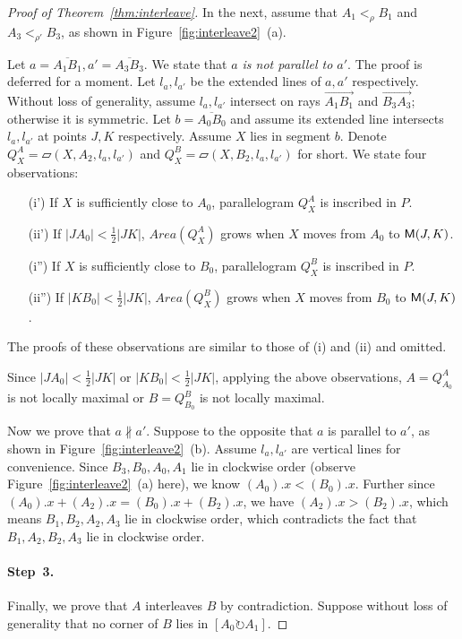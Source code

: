 \documentclass{ws-ijcga}
\begin{document}
\begin{proof}[Proof of Theorem~\ref{thm:interleave}]
In the next, assume that $A_1<_\rho B_1$ and $A_3<_{\rho'} B_3$, as shown in Figure~\ref{fig:interleave2}~(a).

\smallskip Let $a=\overline{A_1B_1},a'=\overline{A_3B_3}$.
We state that \emph{$a$ is not parallel to $a'$}. The proof is deferred for a moment.
Let $l_a,l_{a'}$ be the extended lines of $a,a'$ respectively.
Without loss of generality, assume $l_a,l_{a'}$ intersect on rays $\overrightarrow{A_1B_1}$ and $\overrightarrow{B_3A_3}$; otherwise it is symmetric.
Let $b=\overline{A_0B_0}$ and assume its extended line intersects $l_{a},l_{a'}$ at points $J,K$ respectively.
Assume $X$ lies in segment $b$. Denote $Q^A_X=\parallelogram(X,A_2,l_a,l_{a'})$ and $Q^B_X=\parallelogram(X,B_2,l_a,l_{a'})$ for short.
We state four observations:
\begin{enumerate}
\item[(i')] If $X$ is sufficiently close to $A_0$, parallelogram $Q^A_X$ is inscribed in $P$.
\item[(ii')] If $|JA_0|<\frac{1}{2}|JK|$, $Area(Q^A_X)$ grows when $X$ moves from $A_0$ to $\mathsf{M}(J,K)$.
\item[(i'')] If $X$ is sufficiently close to $B_0$, parallelogram $Q^B_X$ is inscribed in $P$.
\item[(ii'')] If $|KB_0|<\frac{1}{2}|JK|$, $Area(Q^B_X)$ grows when $X$ moves from $B_0$ to $\mathsf{M}(J,K)$.
\end{enumerate}
The proofs of these observations are similar to those of (i) and (ii) and omitted.

\smallskip Since $|JA_0|<\frac{1}{2}|JK|$ or $|KB_0|<\frac{1}{2}|JK|$,
applying the above observations, $A=Q^A_{A_0}$ is not locally maximal or $B=Q^B_{B_0}$ is not locally maximal.

\medskip Now we prove that $a\nparallel a'$.
Suppose to the opposite that $a$ is parallel to $a'$, as shown in Figure~\ref{fig:interleave2}~(b).
Assume $l_a,l_{a'}$ are vertical lines for convenience.
Since $B_3,B_0,A_0,A_1$ lie in clockwise order (observe Figure~\ref{fig:interleave2}~(a) here), we know $(A_0).x < (B_0).x$.
Further since $(A_0).x+(A_2).x=(B_0).x+(B_2).x$, we have $(A_2).x > (B_2).x$, which means $B_1,B_2,A_2,A_3$ lie in clockwise order,
  which contradicts the fact that $B_1,A_2,B_2,A_3$ lie in clockwise order.

\paragraph{Step~3.} Finally, we prove that $A$ interleaves $B$ by contradiction.
Suppose without loss of generality that no corner of $B$ lies in $[A_0\circlearrowright A_1]$.


\end{proof}
\end{document}
